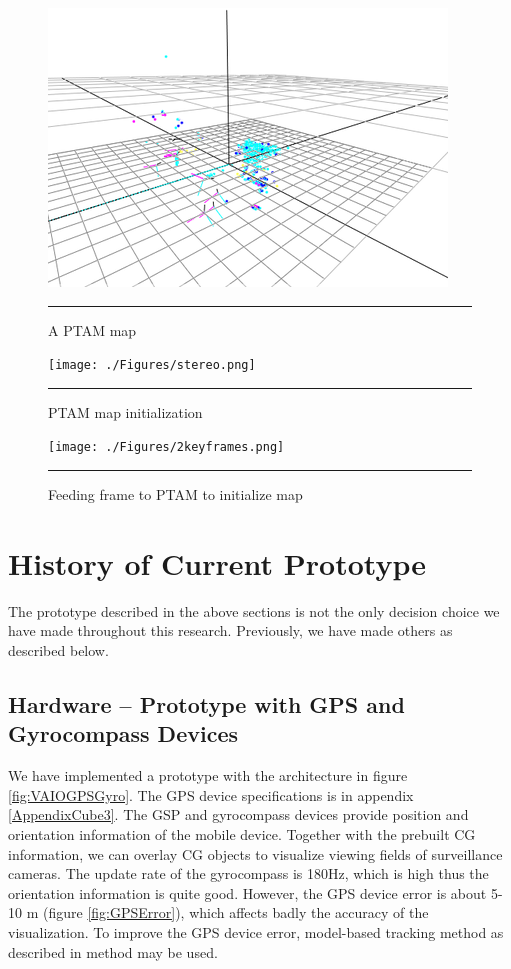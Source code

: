 \begin{figure}[htbp]
	\centering
	\includegraphics{./Primitives/map.png}
	\rule{35em}{0.5pt}
	\caption[A PTAM map]{A PTAM map}
	\label{fig:Map}
\end{figure}

\begin{figure}[htbp]
	\centering
	\texttt{[image: ./Figures/stereo.png]}
	\rule{35em}{0.5pt}
	\caption[PTAM map initialization]{PTAM map initialization}
	\label{fig:Stereo}
\end{figure}

\begin{figure}[htbp]
	\centering
	\texttt{[image: ./Figures/2keyframes.png]}
	\rule{35em}{0.5pt}
	\caption[Feeding frame to PTAM to initialize map]{Feeding frame to PTAM to initialize map}
	\label{fig:2KeyFrames}
\end{figure}


\section{History of Current Prototype}

The prototype described in the above sections is not the only decision choice we have made throughout this research. Previously, we have made others as described below.

\subsection{Hardware -- Prototype with GPS and Gyrocompass Devices}

We have implemented a prototype with the architecture in figure \ref{fig:VAIOGPSGyro}. The GPS device specifications is in appendix \ref{AppendixCube3}. The GSP and gyrocompass devices provide position and orientation information of the mobile device. Together with the prebuilt CG information, we can overlay CG objects to visualize viewing fields of surveillance cameras. The update rate of the gyrocompass is 180Hz, which is high thus the orientation information is quite good. However, the GPS device error is about 5-10 m (figure \ref{fig:GPSError}), which affects badly the accuracy of the visualization. To improve the GPS device error, model-based tracking method as described in \cite{Reference13} method may be used.

